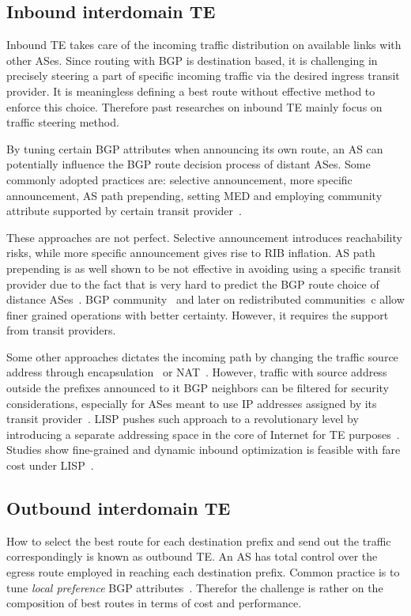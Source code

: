 \subsection{Inbound interdomain TE}
Inbound TE takes care of the incoming traffic distribution on available  links with other ASes.
Since routing with BGP is destination based, it is challenging in precisely steering a part of specific incoming traffic via the desired ingress transit provider. 
It is meaningless defining a best route without effective method to enforce this choice.
Therefore past researches on inbound TE mainly focus on traffic steering method.

By tuning certain BGP attributes when announcing its own route, an AS can potentially influence the BGP route decision process of distant ASes. Some commonly adopted practices are: selective announcement, more specific announcement, AS path prepending, setting \acf{MED} and employing community attribute supported by certain transit provider~\cite{Wang2008}.

These approaches are not perfect. Selective announcement introduces reachability risks, while more specific announcement gives rise to \acf{RIB} inflation. AS path prepending is as well shown to be not effective in avoiding using a specific transit provider due to the fact that is very hard to predict the BGP route choice of distance ASes~\cite{Quoitin2004a}. BGP community~\cite{Donnet2008, Shao2015} and later on redistributed communities~c allow finer grained operations with better certainty. However, it requires the support from transit providers. 

Some other approaches dictates the incoming path by changing the traffic source address through encapsulation~\cite{Liu2008} or \acf{NAT}~\cite{Sun2015}. However, traffic with source address outside the prefixes announced to it BGP neighbors can be filtered for security considerations, especially for ASes meant to use IP addresses assigned by its transit provider~\cite{filtering}.
\acf{LISP} pushes such approach to a revolutionary level by introducing a separate addressing space in the core of Internet for TE purposes~\cite{lisp}. Studies show fine-grained and dynamic inbound optimization is feasible with fare cost under \ac{LISP}~\cite{Iannone2007, saucez2011mechanisms, quoitin2007evaluating}.



\subsection{Outbound interdomain TE}
How to select the best route for each destination prefix and send out the traffic correspondingly is known as outbound TE. 
An AS has total control over the egress route employed in reaching each destination prefix. Common practice is to tune \textit{local preference} BGP attributes~\cite{Wang2008}. 
Therefor the challenge is rather on the composition of best routes in terms of cost and performance.

